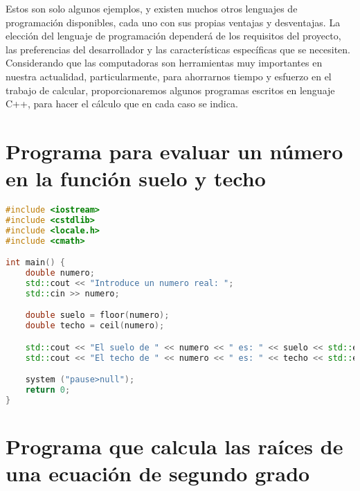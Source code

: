Estos son solo algunos ejemplos, y existen muchos otros lenguajes de programación disponibles, cada uno con sus propias ventajas y desventajas. La elección del lenguaje de programación dependerá de los requisitos del proyecto, las preferencias del desarrollador y las características específicas que se necesiten. Considerando que las computadoras son herramientas muy importantes en nuestra actualidad, particularmente, para ahorrarnos tiempo y esfuerzo en el trabajo de calcular, proporcionaremos algunos programas escritos en lenguaje C++, para hacer el cálculo que en cada caso se indica.

\newpage

\section*{Programa para evaluar un número en la función suelo y techo}

\noindent
\begin{lstlisting}[language=C++]
#include <iostream>
#include <cstdlib>
#include <locale.h>
#include <cmath>

int main() {
    double numero;
    std::cout << "Introduce un numero real: ";
    std::cin >> numero;

    double suelo = floor(numero);
    double techo = ceil(numero);

    std::cout << "El suelo de " << numero << " es: " << suelo << std::endl;
    std::cout << "El techo de " << numero << " es: " << techo << std::endl;

    system ("pause>null");
    return 0;
}
\end{lstlisting}

\section*{Programa que calcula las raíces de una ecuación de segundo grado}

